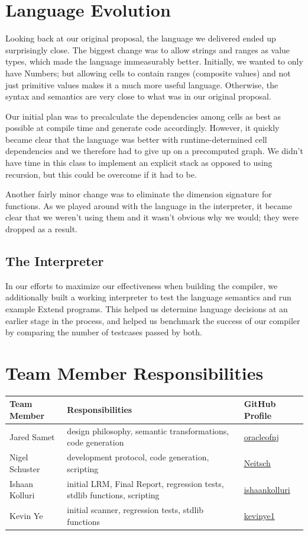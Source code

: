 \section{Language Evolution}
Looking back at our original proposal, the language we delivered ended up surprisingly close. The biggest change was to allow strings and ranges as value types, which made the language immeasurably better. Initially, we wanted to only have Numbers; but allowing cells to contain ranges (composite values) and not just primitive values makes it a much more useful language. Otherwise, the syntax and semantics are very close to what was in our original proposal.

Our initial plan was to precalculate the dependencies among cells as best as possible at compile time and generate code accordingly. However, it quickly became clear that the language was better with runtime-determined cell dependencies and we therefore had to give up on a precomputed graph. We didn't have time in this class to implement an explicit stack as opposed to using recursion, but this could be overcome if it had to be.

Another fairly minor change was to eliminate the dimension signature for functions. As we played around with the language in the interpreter, it became clear that we weren't using them and it wasn't obvious why we would; they were dropped as a result.


  \subsection{The Interpreter}
  In our efforts to maximize our effectiveness when building the compiler, we additionally built a working interpreter to test the language semantics and run example Extend programs. This helped us determine language decisions at an earlier stage in the process, and helped us benchmark the success of our compiler by comparing the number of testcases passed by both.

\section{Team Member Responsibilities}

\begin{tabular}{ | l | l | l |}\hline
  Team Member  & Responsibilities      & GitHub Profile\\ \hline
  Jared Samet & design philosophy, semantic transformations, code generation  & \underline{\href{https://github.com/oracleofnj}{oracleofnj}}\\
  Nigel Schuster & development protocol, code generation, scripting  & \underline{\href{https://github.com/Neitsch}{Neitsch}}\\
  Ishaan Kolluri & initial LRM, Final Report, regression tests, stdlib functions, scripting & \underline{\href{https://github.com/ishaankolluri}{ishaankolluri}}\\
  Kevin Ye & initial scanner, regression tests, stdlib functions & \underline{\href{https://github.com/kevinye1}{kevinye1}}\\ \hline
\end{tabular}
